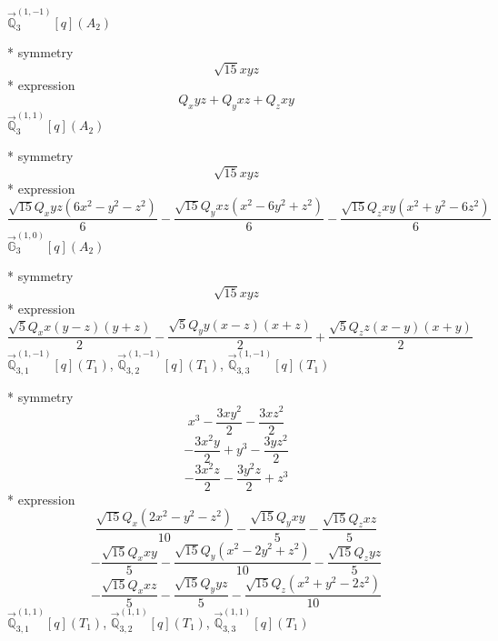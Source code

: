 \documentclass[fleqn,8pt]{jsarticle}
\begin{document}
\noindent\quad $\vec{\mathbb{Q}}_{3}^{(1,-1)}[q](A_{2})$

\noindent\quad ** symmetry
\begin{dmath*}
\sqrt{15} x y z
\end{dmath*}
\noindent\quad ** expression
\begin{dmath*}
Q_{x} y z + Q_{y} x z + Q_{z} x y
\end{dmath*}
\noindent\quad $\vec{\mathbb{Q}}_{3}^{(1,1)}[q](A_{2})$

\noindent\quad ** symmetry
\begin{dmath*}
\sqrt{15} x y z
\end{dmath*}
\noindent\quad ** expression
\begin{dmath*}
\frac{\sqrt{15} Q_{x} y z \left(6 x^{2} - y^{2} - z^{2}\right)}{6} - \frac{\sqrt{15} Q_{y} x z \left(x^{2} - 6 y^{2} + z^{2}\right)}{6} - \frac{\sqrt{15} Q_{z} x y \left(x^{2} + y^{2} - 6 z^{2}\right)}{6}
\end{dmath*}
\noindent\quad $\vec{\mathbb{G}}_{3}^{(1,0)}[q](A_{2})$

\noindent\quad ** symmetry
\begin{dmath*}
\sqrt{15} x y z
\end{dmath*}
\noindent\quad ** expression
\begin{dmath*}
\frac{\sqrt{5} Q_{x} x \left(y - z\right) \left(y + z\right)}{2} - \frac{\sqrt{5} Q_{y} y \left(x - z\right) \left(x + z\right)}{2} + \frac{\sqrt{5} Q_{z} z \left(x - y\right) \left(x + y\right)}{2}
\end{dmath*}
\noindent\quad $\vec{\mathbb{Q}}_{3,1}^{(1,-1)}[q](T_{1})$, $\vec{\mathbb{Q}}_{3,2}^{(1,-1)}[q](T_{1})$, $\vec{\mathbb{Q}}_{3,3}^{(1,-1)}[q](T_{1})$

\noindent\quad ** symmetry
\begin{dmath*}
x^{3} - \frac{3 x y^{2}}{2} - \frac{3 x z^{2}}{2}
\end{dmath*}
\begin{dmath*}
- \frac{3 x^{2} y}{2} + y^{3} - \frac{3 y z^{2}}{2}
\end{dmath*}
\begin{dmath*}
- \frac{3 x^{2} z}{2} - \frac{3 y^{2} z}{2} + z^{3}
\end{dmath*}
\noindent\quad ** expression
\begin{dmath*}
\frac{\sqrt{15} Q_{x} \left(2 x^{2} - y^{2} - z^{2}\right)}{10} - \frac{\sqrt{15} Q_{y} x y}{5} - \frac{\sqrt{15} Q_{z} x z}{5}
\end{dmath*}
\begin{dmath*}
- \frac{\sqrt{15} Q_{x} x y}{5} - \frac{\sqrt{15} Q_{y} \left(x^{2} - 2 y^{2} + z^{2}\right)}{10} - \frac{\sqrt{15} Q_{z} y z}{5}
\end{dmath*}
\begin{dmath*}
- \frac{\sqrt{15} Q_{x} x z}{5} - \frac{\sqrt{15} Q_{y} y z}{5} - \frac{\sqrt{15} Q_{z} \left(x^{2} + y^{2} - 2 z^{2}\right)}{10}
\end{dmath*}
\noindent\quad $\vec{\mathbb{Q}}_{3,1}^{(1,1)}[q](T_{1})$, $\vec{\mathbb{Q}}_{3,2}^{(1,1)}[q](T_{1})$, $\vec{\mathbb{Q}}_{3,3}^{(1,1)}[q](T_{1})$
\end{document}
